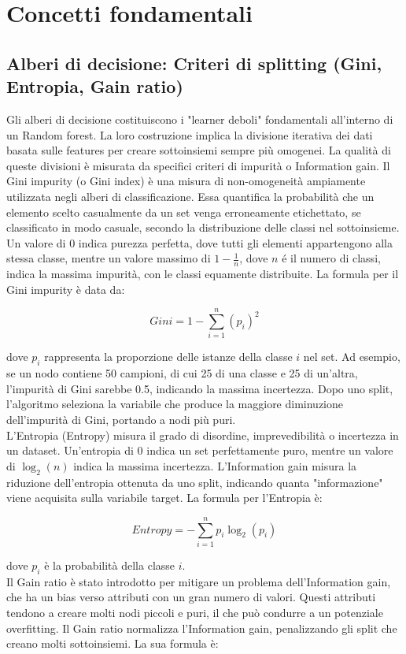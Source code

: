 \documentclass[a4paper,12pt]{report}
\begin{document}
	\section{Concetti fondamentali}
	
	\subsection{Alberi di decisione: Criteri di splitting (Gini, Entropia, Gain ratio)}
	
	Gli alberi di decisione costituiscono i "learner deboli" fondamentali all'interno di un Random forest. La loro costruzione implica la divisione iterativa dei dati basata sulle features per creare sottoinsiemi sempre più omogenei. La qualità di queste divisioni è misurata da specifici criteri di impurità o Information gain. Il Gini impurity (o Gini index) è una misura di non-omogeneità ampiamente utilizzata negli alberi di classificazione. Essa quantifica la probabilità che un elemento scelto casualmente da un set venga erroneamente etichettato, se classificato in modo casuale, secondo la distribuzione delle classi nel sottoinsieme. Un valore di 0 indica purezza perfetta, dove tutti gli elementi appartengono alla stessa classe, mentre un valore massimo di $1 - \frac{1}{n}$, dove $n$ é il numero di classi, indica la massima impurità, con le classi equamente distribuite. La formula per il Gini impurity è data da:
	
	$$Gini = 1 - \sum_{i=1}^{n} (p_i)^2$$
	
	dove $p_i$ rappresenta la proporzione delle istanze della classe $i$ nel set. Ad esempio, se un nodo contiene 50 campioni, di cui 25 di una classe e 25 di un'altra, l'impurità di Gini sarebbe 0.5, indicando la massima incertezza. Dopo uno split, l'algoritmo seleziona la variabile che produce la maggiore diminuzione dell'impurità di Gini, portando a nodi più puri. \\
	L'Entropia (Entropy) misura il grado di disordine, imprevedibilità o incertezza in un dataset. Un'entropia di 0 indica un set perfettamente puro, mentre un valore di $\log_2(n)$ indica la massima incertezza. L'Information gain misura la riduzione dell'entropia ottenuta da uno split, indicando quanta "informazione" viene acquisita sulla variabile target. La formula per l'Entropia è:
	
	$$Entropy = - \sum_{i=1}^{n} p_i \log_2(p_i)$$
	
	dove $p_i$ è la probabilità della classe $i$. \\
	Il Gain ratio è stato introdotto per mitigare un problema dell'Information gain, che ha un bias verso attributi con un gran numero di valori. Questi attributi tendono a creare molti nodi piccoli e puri, il che può condurre a un potenziale overfitting. Il Gain ratio normalizza l'Information gain, penalizzando gli split che creano molti sottoinsiemi. La sua formula è:
	
\end{document}
